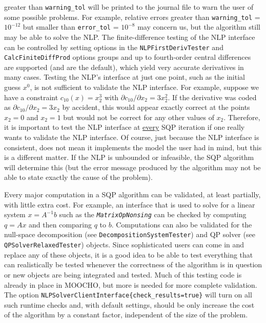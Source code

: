 \documentclass[pdf,12pt,report]{SANDreport}
\begin{document}
greater than {}\texttt{warning\_tol} will be printed to the journal file to
warn the user of some possible problems.  For example, relative errors greater
than {}\texttt{warning\_tol} = $10^{-12}$ but smaller than
{}\texttt{error\_tol} = $10^{-8}$ may concern us, but the algorithm still may
be able to solve the NLP.  The finite-difference testing of the NLP interface
can be controlled by setting options in the
{}\texttt{NLP\-First\-Deriv\-Tester} and {}\texttt{Calc\-Finite\-Diff\-Prod}
options groups and up to fourth-order central differences are supported (and
are the default), which yield very accurate derivatives in many cases.
Testing the NLP's interface at just one point, such as the initial guess
$x^0$, is not sufficient to validate the NLP interface.  For example, suppose
we have a constraint $c_{10}(x) = x_2^3$ with $\partial c_{10} / \partial x_2
= 3 x_2 ^ 2$.  If the derivative was coded as $\partial c_{10} / \partial x_2
= 3 x_2$ by accident, this would appear exactly correct at the points $x_2 =
0$ and $x_2 = 1$ but would not be correct for any other values of $x_2$.
Therefore, it is important to test the NLP interface at {}\underline{every}
SQP iteration if one really wants to validate the NLP interface.  Of course,
just because the NLP interface is consistent, does not mean it implements the
model the user had in mind, but this is a different matter.  If the NLP is
unbounded or infeasible, the SQP algorithm will determine this (but the error
message produced by the algorithm may not be able to state exactly the cause
of the problem).

Every major computation in a SQP algorithm can be validated, at least
partially, with little extra cost.  For example, an interface that is used to
solve for a linear system $x = A^{-1} b$ such as the
{}\texttt{\textit{Matrix\-Op\-Nonsing}} can be checked by computing $q = A x$
and then comparing $q$ to $b$.  Computations can also be validated for the
null-space decomposition (see {}\texttt{Decomposition\-System\-Tester}) and QP
solver (see {}\texttt{QPSolver\-Relaxed\-Tester}) objects.  Since
sophisticated users can come in and replace any of these objects, it is a good
idea to be able to test everything that can realistically be tested whenever
the correctness of the algorithm is in question or new objects are being
integrated and tested.  Much of this testing code is already in place in
MOOCHO, but more is needed for more complete validation.  The option
{}\texttt{NLP\-Solver\-Client\-Interface\{check\-\_results=true\}} will turn
on all such runtime checks and, with default settings, should be only increase
the cost of the algorithm by a constant factor, independent of the size of the
problem.
\end{document}

